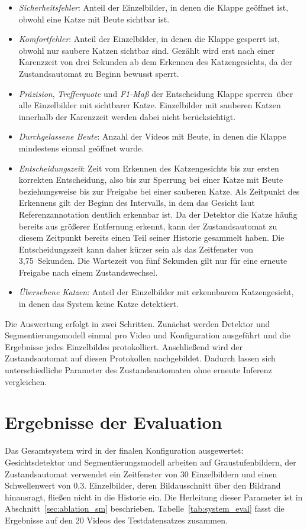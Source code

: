 \begin{itemize}
    \item \emph{Sicherheitsfehler}: Anteil der Einzelbilder, in denen die Klappe geöffnet ist, obwohl eine Katze mit Beute sichtbar ist.
    \item \emph{Komfortfehler}: Anteil der Einzelbilder, in denen die Klappe gesperrt ist, obwohl nur saubere Katzen sichtbar sind. Gezählt wird erst nach einer Karenzzeit von drei Sekunden ab dem Erkennen des Katzengesichts, da der Zustandsautomat zu Beginn bewusst sperrt.
    \item \emph{Präzision}, \emph{Trefferquote} und \emph{F1-Maß} der Entscheidung \glqq Klappe sperren\grqq\ über alle Einzelbilder mit sichtbarer Katze. Einzelbilder mit sauberen Katzen innerhalb der Karenzzeit werden dabei nicht berücksichtigt.
    \item \emph{Durchgelassene Beute}: Anzahl der Videos mit Beute, in denen die Klappe mindestens einmal geöffnet wurde.
    \item \emph{Entscheidungszeit}: Zeit vom Erkennen des Katzengesichts bis zur ersten korrekten Entscheidung, also bis zur Sperrung bei einer Katze mit Beute beziehungsweise bis zur Freigabe bei einer sauberen Katze. Als Zeitpunkt des Erkennens gilt der Beginn des Intervalls, in dem das Gesicht laut Referenzannotation deutlich erkennbar ist. Da der Detektor die Katze häufig bereits aus größerer Entfernung erkennt, kann der Zustandsautomat zu diesem Zeitpunkt bereits einen Teil seiner Historie gesammelt haben. Die Entscheidungszeit kann daher kürzer sein als das Zeitfenster von 3,75~Sekunden. Die Wartezeit von fünf Sekunden gilt nur für eine erneute Freigabe nach einem Zustandswechsel.
    \item \emph{Übersehene Katzen}: Anteil der Einzelbilder mit erkennbarem Katzengesicht, in denen das System keine Katze detektiert.
\end{itemize}

Die Auswertung erfolgt in zwei Schritten. Zunächst werden Detektor und Segmentierungsmodell einmal pro Video und Konfiguration ausgeführt und die Ergebnisse jedes Einzelbildes protokolliert. Anschließend wird der Zustandsautomat auf diesen Protokollen nachgebildet. Dadurch lassen sich unterschiedliche Parameter des Zustandsautomaten ohne erneute Inferenz vergleichen.

\section{Ergebnisse der Evaluation}
Das Gesamtsystem wird in der finalen Konfiguration ausgewertet: Gesichtsdetektor und Segmentierungsmodell arbeiten auf Graustufenbildern, der Zustandsautomat verwendet ein Zeitfenster von 30 Einzelbildern und einen Schwellenwert von 0,3. Einzelbilder, deren Bildausschnitt über den Bildrand hinausragt, fließen nicht in die Historie ein. Die Herleitung dieser Parameter ist in Abschnitt~\ref{sec:ablation_sm} beschrieben. Tabelle~\ref{tab:system_eval} fasst die Ergebnisse auf den 20 Videos des Testdatensatzes zusammen.

